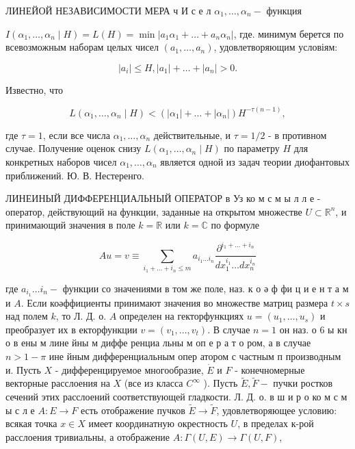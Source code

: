 \documentclass[10pt]{article}
\begin{document}
ЛИНЕЙОЙ НЕЗАВИСИМОСТИ МЕРА ч И с е л $\alpha_{1}, \ldots, \alpha_{n}-$ функция



$I\left(\alpha_{1}, \ldots, \alpha_{n} \mid H\right)=L(H)=\min \left|a_{1} \alpha_{1}+\ldots+a_{n} \alpha_{n}\right|$, где. минимум берется по всевозможным наборам целых чисел $\left(a_{1}, \ldots, a_{n}\right)$, удовлетворяющим условіям:



\[

\left|a_{i}\right| \leqslant H,\left|a_{1}\right|+\ldots+\left|a_{n}\right|>0 .

\]



Известно, что



\[

L\left(\alpha_{1}, \ldots, \alpha_{n} \mid H\right)<\left(\left|\alpha_{1}\right|+\ldots+\left|\alpha_{n}\right|\right) H^{-\tau(n-1)},

\]



где $\tau=1$, если все числа $\alpha_{1}, \ldots, \alpha_{n}$ действительные, и $\tau=1 / 2$ - в противном случае. Получение оценок снизу $L\left(\alpha_{1}, \ldots, \alpha_{n} \mid H\right)$ по параметру $H$ для конкретных наборов чисел $\alpha_{1}, \ldots, \alpha_{n}$ является одной из задач теории диофантовых приближений. Ю. В. Нестеренго.



ЛИНЕИНЫЙ ДИФФЕРЕНЦИАЛЬНЫЙ ОПЕРАТОР в Уз ко м с м ы л л е - оператор, действующий на функции, заданные на открытом множестве $U \subset \mathbb{R}^{n}$, и принимающий значения в поле $k=\mathbb{R}$ или $k=\mathbb{C}$ по формуле



\[

A u=v \equiv \sum_{i_{1}+\ldots+i_{n} \leqslant m} a_{i_{1} \ldots i_{n}} \frac{\partial^{i_{1}+\ldots+i_{n}}}{d x_{1}^{i_{1}} \ldots d x_{n}^{i_{n}}}

\]



где $a_{i_{1}} \ldots i_{n}-$ функции со значениями в том же поле, наз. к о ә ф фи ц и е н т а м и $A$. Если коәффициенты принимают значения во множестве матриц размера $t \times s$ над полем $k$, то Л. Д. о. $A$ определен на гекторфункциях $u=\left(u_{1}, \ldots, u_{s}\right)$ и преобразует их в екторфункции $v=\left(v_{1}, \ldots, v_{t}\right)$. В случае $n=1$ он наз. о 6 ы кн о в ены м лине йны м диффе ренциа льны м оп е р а т о ром, а в случае $n>1-\pi$ ине йным дифференциальным опер атором с частным п производным и. Пусть $X$ - дифференцируемое многообразие, $\dot{E}$ и $F$ - конечномерные векторные расслоения на $X$ (все из класса $C^{\infty}$ ). Пусть $\widetilde{E}, \tilde{F}-$ пучки ростков сечений этих расслоений соответствующей гладкости. Л. Д. $о$. в ш и р о ко м с м ы с л е $A: E \rightarrow F$ есть отображение пучков $\tilde{E} \rightarrow \tilde{F}$, удовлетворяющее условию: всякая точка $x \in X$ имеет координатную окрестность $U$, в пределах к-рой расслоения тривиальны, а отображение $A: \Gamma(U, E) \rightarrow \Gamma(U, F)$,
\end{document}
